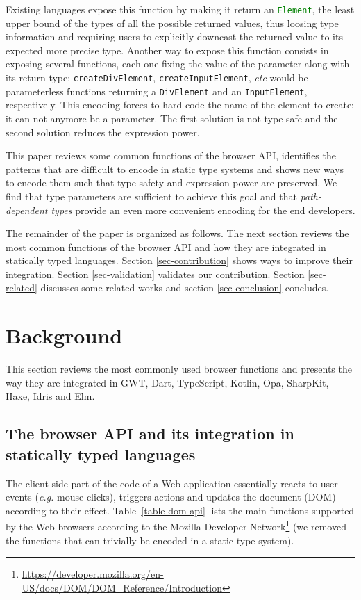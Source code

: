 \documentclass{llncs}
\newcommand{\jscode}[1]{\lstinline[language=JavaScript]|#1|}
\begin{document}
Existing languages expose this function by making it return an \jscode{Element}, the least upper bound of the types of all the possible returned values, thus loosing type information and requiring users to explicitly downcast the returned value to its expected more precise type. Another way to expose this function consists in exposing several functions, each one fixing the value of the parameter along with its return type: \jscode{createDivElement}, \jscode{createInputElement}, \emph{etc} would be parameterless functions returning a \jscode{DivElement} and an \jscode{InputElement}, respectively. This encoding forces to hard-code the name of the element to create: it can not anymore be a parameter. The first solution is not type safe and the second solution reduces the expression power.

This paper reviews some common functions of the browser API, identifies the patterns that are difficult to encode in static type systems and shows new ways to encode them such that type safety and expression power are preserved. We find that type parameters are sufficient to achieve this goal and that \emph{path-dependent types} provide an even more convenient encoding for the end developers.

The remainder of the paper is organized as follows. The next section reviews the most common functions of the browser API and how they are integrated in statically typed languages. Section \ref{sec-contribution} shows ways to improve their integration. Section \ref{sec-validation} validates our contribution. Section \ref{sec-related} discusses some related works and section \ref{sec-conclusion} concludes.

\section{Background}
\label{sec-background}

This section reviews the most commonly used browser functions and presents the way they are integrated in GWT, Dart, TypeScript, Kotlin, Opa, SharpKit, Haxe, Idris and Elm.

\subsection{The browser API and its integration in statically typed languages}

The client-side part of the code of a Web application essentially reacts to user events (\emph{e.g.} mouse clicks), triggers actions and updates the document (DOM) according to their effect. Table~\ref{table-dom-api} lists the main functions supported by the Web browsers according to the Mozilla Developer Network\footnote{\href{https://developer.mozilla.org/en-US/docs/DOM/DOM\_Reference/Introduction}{https://developer.mozilla.org/en-US/docs/DOM/DOM\_Reference/Introduction}} (we removed the functions that can trivially be encoded in a static type system).
\end{document}
